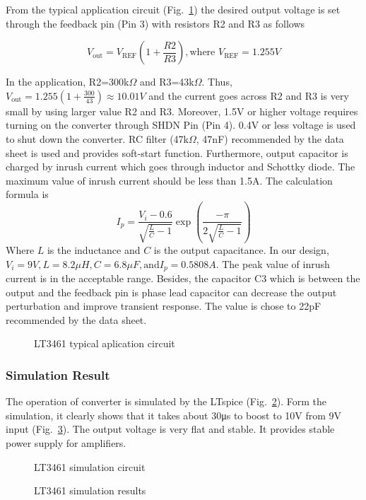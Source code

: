 From the typical application circuit (Fig.~\ref{fig:LT3461}) the desired output voltage is set through the feedback pin (Pin 3) with resistors R2 and R3 as follows

\begin{equation}
V_{\textrm{out}} = V_{\textrm{REF}}\left(1+\frac{R2}{R3}\right), \textrm{where } V_\textrm{REF} = 1.255V
\label{eq:LT3461}
\end{equation}

In the application, R2=300k$\Omega$ and R3=43k$\Omega$. Thus, $V_\textrm{out}=1.255\left(1+\frac{300}{43}\right) \approx 10.01V$ and the current goes across R2 and R3 is very small by using larger value R2 and R3. Moreover, 1.5V or higher voltage requires turning on the converter through SHDN Pin (Pin 4). 0.4V or less voltage is used to shut down the converter. RC filter (47k$\Omega$, 47nF) recommended by the data sheet is used and provides soft-start function. Furthermore, output capacitor is charged by inrush current which goes through inductor and Schottky diode. The maximum value of inrush current should be less than 1.5A. The calculation formula is 
\begin{equation}
I_p = \frac{V_i-0.6}{\sqrt{\frac{L}{C}-1}} \exp{ \left( \frac{-\pi}{2\sqrt{\frac{L}{C}-1}} \right)}
\label{eq:inrush_current}
\end{equation}
Where $L$ is the inductance and $C$ is the output capacitance.
In our design, $V_i=9V, L=8.2\mu H, C=6.8\mu F, \textrm{and} I_p=0.5808A$. The peak value of inrush current is in the acceptable range. Besides, the capacitor C3 which is between the output and the feedback pin is phase lead capacitor can decrease the output perturbation and improve transient response. The value is chose to 22pF recommended by the data sheet.

\begin{figure}[!tbh]
	\centering
	\caption{LT3461 typical aplication circuit\cite{LT3461_datasheet}}
	\label{fig:LT3461}
\end{figure}

\subsubsection{Simulation Result}
The operation of converter is simulated by the LTspice (Fig.~\ref{fig:LT3461_ltspice}). Form the simulation, it clearly shows that it takes about 30μs to boost to 10V from 9V input (Fig.~\ref{fig:LT3461_sim}). The output voltage is very flat and stable. It provides stable power supply for amplifiers. 
\begin{figure}[!tbh]
	\centering
	\caption{LT3461 simulation circuit}
	\label{fig:LT3461_ltspice}
\end{figure}
\begin{figure}[!tbh]
	\centering
	\caption{LT3461 simulation results}
	\label{fig:LT3461_sim}
\end{figure}


